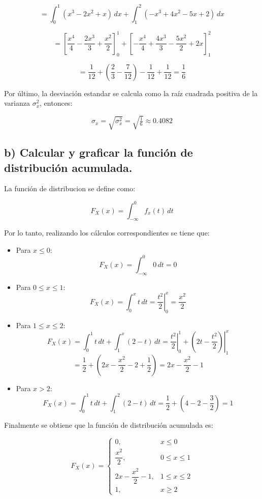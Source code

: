 	\[
		= \int_{0}^{1} (x^3 - 2x^2 + x) \, dx + \int_{1}^{2} (-x^3 + 4x^2 - 5x + 2)\, dx
	\]
	
	\[
		= \left[ \frac{x^4}{4} - \frac{2x^3}{3} + \frac{x^2}{2} \right]_{0}^{1}
		+ \left[ -\frac{x^4}{4} + \frac{4x^3}{3} - \frac{5x^2}{2} + 2x \right]_{1}^{2}
	\]
	
	\[
		= \frac{1}{12} + \left( \frac{2}{3} - \frac{7}{12} \right) - \frac{1}{12} + \frac{1}{12}
		= \frac{1}{6}
	\]
	
	Por último, la desviación estandar se calcula como la raíz cuadrada positiva de la varianza $\sigma_x^{2}$, entonces:
	
	\[
		\sigma_x = \sqrt{\sigma_x^2} = \sqrt{\tfrac{1}{6}} \approx 0.4082
	\]
	

\subsection*{b) Calcular y graficar la función de distribución acumulada.}

 La función de distribucion se define como:
 
 \[
 	 F_X(x) = \int_{-\infty}^{0} f_x (t) \, dt 
 \]
 
 Por lo tanto, realizando los cálculos correspondientes se tiene que: 
 

\begin{itemize}
	\item Para $x \leq 0$:
	\[
	F_X(x) = \int_{-\infty}^{0} 0 \, dt = 0
	\]
	
	\item Para $0 \leq x \leq 1$:
	\[
	F_X(x) = \int_{0}^{x} t \, dt 
	= \left. \frac{t^2}{2} \right|_{0}^{x} 
	= \frac{x^2}{2}
	\]
	
	\item Para $1 \leq x \leq 2$:
	\[
	F_X(x) = \int_{0}^{1} t \, dt + \int_{1}^{x} (2-t)\, dt
	= \left. \frac{t^2}{2} \right|_{0}^{1} + \left. \left(2t - \frac{t^2}{2}\right) \right|_{1}^{x}
	\]
	\[
	= \frac{1}{2} + \left(2x - \frac{x^2}{2} - 2 + \frac{1}{2}\right)
	= 2x - \frac{x^2}{2} - 1
	\]
	
	\item Para $x > 2$:
	\[
	F_X(x) = \int_{0}^{1} t \, dt + \int_{1}^{2} (2-t)\, dt 
	= \frac{1}{2} + \left(4 - 2 - \frac{3}{2}\right) 
	= 1
	\]
\end{itemize}
 
 Finalmente se obtiene que la función de distribución acumulada es: 
 
 \[
	 F_X(x) =
		 \begin{cases}
		 	0, & x \leq 0 \\[6pt]
		 	\dfrac{x^2}{2}, & 0 \leq x \leq 1 \\[6pt]
		 	2x - \dfrac{x^2}{2} - 1, & 1 \leq x \leq 2 \\[6pt]
		 	1, & x \geq 2
		 \end{cases}
	 \]

